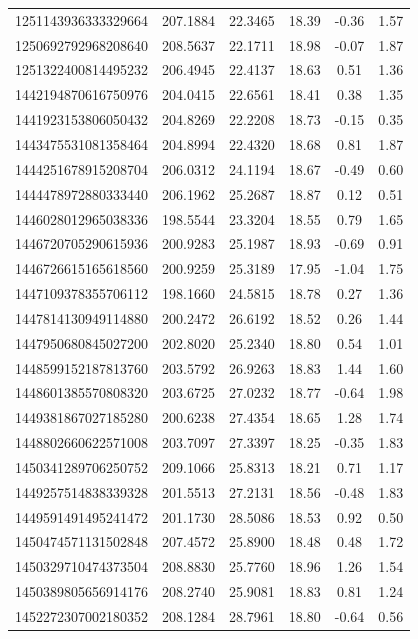 \begin{longtable}{c c c c c c}
1251143936333329664 & 207.1884 & 22.3465 & 18.39 & -0.36 & 1.57 \\
1250692792968208640 & 208.5637 & 22.1711 & 18.98 & -0.07 & 1.87 \\
1251322400814495232 & 206.4945 & 22.4137 & 18.63 & 0.51 & 1.36 \\
1442194870616750976 & 204.0415 & 22.6561 & 18.41 & 0.38 & 1.35 \\
1441923153806050432 & 204.8269 & 22.2208 & 18.73 & -0.15 & 0.35 \\
1443475531081358464 & 204.8994 & 22.4320 & 18.68 & 0.81 & 1.87 \\
1444251678915208704 & 206.0312 & 24.1194 & 18.67 & -0.49 & 0.60 \\
1444478972880333440 & 206.1962 & 25.2687 & 18.87 & 0.12 & 0.51 \\
1446028012965038336 & 198.5544 & 23.3204 & 18.55 & 0.79 & 1.65 \\
1446720705290615936 & 200.9283 & 25.1987 & 18.93 & -0.69 & 0.91 \\
1446726615165618560 & 200.9259 & 25.3189 & 17.95 & -1.04 & 1.75 \\
1447109378355706112 & 198.1660 & 24.5815 & 18.78 & 0.27 & 1.36 \\
1447814130949114880 & 200.2472 & 26.6192 & 18.52 & 0.26 & 1.44 \\
1447950680845027200 & 202.8020 & 25.2340 & 18.80 & 0.54 & 1.01 \\
1448599152187813760 & 203.5792 & 26.9263 & 18.83 & 1.44 & 1.60 \\
1448601385570808320 & 203.6725 & 27.0232 & 18.77 & -0.64 & 1.98 \\
1449381867027185280 & 200.6238 & 27.4354 & 18.65 & 1.28 & 1.74 \\
1448802660622571008 & 203.7097 & 27.3397 & 18.25 & -0.35 & 1.83 \\
1450341289706250752 & 209.1066 & 25.8313 & 18.21 & 0.71 & 1.17 \\
1449257514838339328 & 201.5513 & 27.2131 & 18.56 & -0.48 & 1.83 \\
1449591491495241472 & 201.1730 & 28.5086 & 18.53 & 0.92 & 0.50 \\
1450474571131502848 & 207.4572 & 25.8900 & 18.48 & 0.48 & 1.72 \\
1450329710474373504 & 208.8830 & 25.7760 & 18.96 & 1.26 & 1.54 \\
1450389805656914176 & 208.2740 & 25.9081 & 18.83 & 0.81 & 1.24 \\
1452272307002180352 & 208.1284 & 28.7961 & 18.80 & -0.64 & 0.56 \\

\end{longtable}
